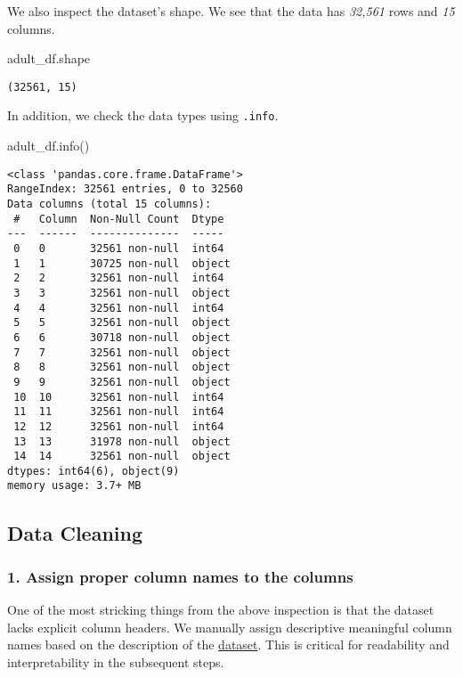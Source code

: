 \documentclass[
  letterpaper,
  DIV=11,
  numbers=noendperiod]{scrartcl}
\newenvironment{Shaded}{\begin{snugshade}}{\end{snugshade}}
\newcommand{\NormalTok}[1]{\textcolor[rgb]{0.00,0.23,0.31}{#1}}
\begin{document}
We also inspect the dataset's shape. We see that the data has
\emph{32,561} rows and \emph{15} columns.

\begin{Shaded}
\begin{Highlighting}[]
\NormalTok{adult\_df.shape}
\end{Highlighting}
\end{Shaded}

\begin{verbatim}
(32561, 15)
\end{verbatim}

In addition, we check the data types using \texttt{.info}.

\begin{Shaded}
\begin{Highlighting}[]
\NormalTok{adult\_df.info()}
\end{Highlighting}
\end{Shaded}

\begin{verbatim}
<class 'pandas.core.frame.DataFrame'>
RangeIndex: 32561 entries, 0 to 32560
Data columns (total 15 columns):
 #   Column  Non-Null Count  Dtype 
---  ------  --------------  ----- 
 0   0       32561 non-null  int64 
 1   1       30725 non-null  object
 2   2       32561 non-null  int64 
 3   3       32561 non-null  object
 4   4       32561 non-null  int64 
 5   5       32561 non-null  object
 6   6       30718 non-null  object
 7   7       32561 non-null  object
 8   8       32561 non-null  object
 9   9       32561 non-null  object
 10  10      32561 non-null  int64 
 11  11      32561 non-null  int64 
 12  12      32561 non-null  int64 
 13  13      31978 non-null  object
 14  14      32561 non-null  object
dtypes: int64(6), object(9)
memory usage: 3.7+ MB
\end{verbatim}

\subsection{Data Cleaning}\label{data-cleaning}

\subsubsection{1. Assign proper column names to the
columns}\label{assign-proper-column-names-to-the-columns}

One of the most stricking things from the above inspection is that the
dataset lacks explicit column headers. We manually assign descriptive
meaningful column names based on the description of the
\href{https://archive.ics.uci.edu/dataset/2/adult}{dataset}. This is
critical for readability and interpretability in the subsequent steps.
\end{document}
